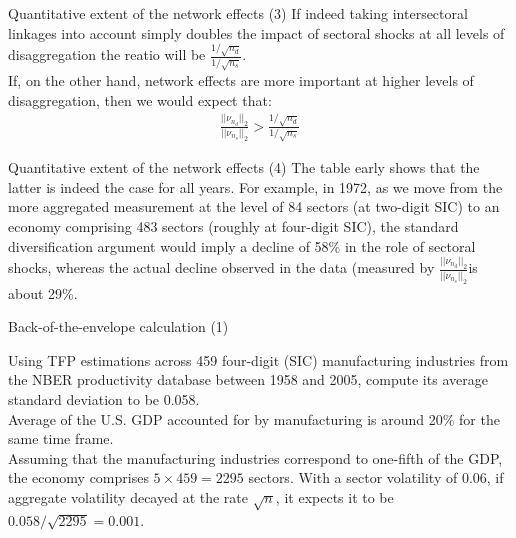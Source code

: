 \documentclass{beamer}
\begin{document}
\begin{frame}{Quantitative extent of the network effects (3)}
    \justifying
    If indeed taking intersectoral linkages into account
    simply doubles the impact of sectoral shocks at all levels of disaggregation
    the reatio will be  $\frac{1/\sqrt{n_d}}{1/\sqrt{n_s}}$.\\[5pt]

    If, on the other hand, network effects are more important at higher 
    levels of disaggregation, then we would expect that:
    \begin{align*}
        \frac{||\nu_{n_d}||_2}{||\nu_{n_s}||_2}>\frac{1/\sqrt{n_d}}{1/\sqrt{n_s}}
    \end{align*}


\end{frame}
\begin{frame}{Quantitative extent of the network effects (4)}
    \justifying
    The table early shows that the latter is indeed the case for all years. 
    For example, in 1972, as we move
    from the more aggregated measurement at the level of 84 sectors (at two-digit
    SIC) to an economy comprising 483 sectors (roughly at four-digit SIC), the
    standard diversification argument would imply a decline of 58\% in the role of
    sectoral shocks, whereas the actual decline observed in the data (measured by
    $\frac{||\nu_{n_d}||_2}{||\nu_{n_s}||_2}$is about 29\%.
    
\end{frame}









\begin{frame}{Back-of-the-envelope calculation (1)}
    \justifying


    Using TFP estimations across 459 four-digit (SIC) manufacturing industries
    from the NBER productivity database between 1958 and 2005, compute
    its average standard deviation to be 0.058.\\[5pt]

    Average of the U.S. GDP accounted for by manufacturing is around 20\% for the 
    same time frame.\\[5pt]

Assuming that the manufacturing industries 
correspond to one-fifth of the GDP, the economy comprises $5 × 459 = 2295$ 
sectors. With a sector volatility of 0.06, if aggregate volatility decayed at
the rate $\sqrt{n}$, it expects it to be $0.058 / \sqrt{2295}=0.001$.\\[5pt]

\end{frame}
\end{document}
